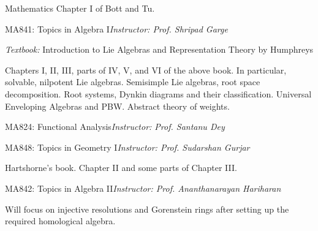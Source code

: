 \begin{rubric}{Mathematics}
    Chapter I of Bott and Tu. 

    \entry*[AA] MA841: Topics in Algebra I\hfill\emph{Instructor: Prof. Shripad Garge}

    \emph{Textbook:} Introduction to Lie Algebras and Representation Theory by Humphreys

    Chapters I, II, III, parts of IV, V, and VI of the above book. In particular, solvable, nilpotent Lie algebras. Semisimple Lie algebras, root space decomposition. Root systems, Dynkin diagrams and their classification. Universal Enveloping Algebras and PBW. Abstract theory of weights.

    \entry*[N/A] MA824: Functional Analysis\hfill\emph{Instructor: Prof. Santanu Dey}

    \entry*[N/A] MA848: Topics in Geometry I\hfill\emph{Instructor: Prof. Sudarshan Gurjar}

    Hartshorne's book. Chapter II and some parts of Chapter III.

    \entry*[N/A] MA842: Topics in Algebra II\hfill\emph{Instructor: Prof. Ananthanarayan Hariharan}

    Will focus on injective resolutions and Gorenstein rings after setting up the required homological algebra.
\end{rubric}